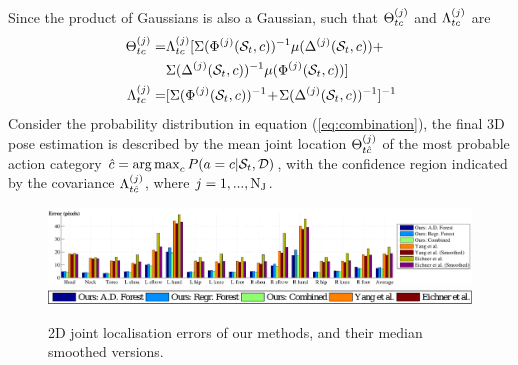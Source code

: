 Since the product of Gaussians is also a Gaussian, such that $\Theta^{(j)}_{t c}$ and $\Lambda^{(j)}_{t c}$ are 
\begin{equation}
	\label{eq:combination2}
	\begin{split}
		\Theta^{(j)}_{t c} = & \Lambda^{(j)}_{t c} 
		[
			\Sigma(\Phi^{(j)}(\mathcal{S}_{t}, c))^{-1} 
			\mu(\Delta^{(j)}(\mathcal{S}_{t}, c)) + \\ &  
			\Sigma(\Delta^{(j)}(\mathcal{S}_{t}, c))^{-1} 
			\mu(\Phi^{(j)}(\mathcal{S}_{t}, c))
		] \\  
		\Lambda^{(j)}_{t c} = &  
		[
			\Sigma(\Phi^{(j)}(\mathcal{S}_{t}, c))^{-1}\!
			+\!
			\Sigma(\Delta^{(j)}(\mathcal{S}_{t}, c))^{-1} 
		]^{-1}\!
		\end{split}
	\end{equation}
	Consider the probability distribution in equation (\ref{eq:combination}), the final 3D pose estimation is described by the mean joint location $\Theta^{(j)}_{t\hat{c}}$ of the most probable action category $\hat{c} = \operatorname*{arg\,max}_c  P(a = c | \mathcal{S}_{t}, \mathcal{D})$, with the confidence region indicated by the covariance $\Lambda^{(j)}_{t\hat{c}}$, where $ j=1,...,\mathrm{N_{J}}$. 

\label{sec:eval}

\begin{figure}[ht]
	\centering
	\includegraphics[width=1.02\linewidth]{fig/body/errplot2d.pdf} 
 	\includegraphics[width=0.6\linewidth]{fig/body/plot_legend.pdf}
	\caption{2D joint localisation errors of our methods, \cite{Yang2011} and \cite{Eichner2012} their median smoothed versions.}
\label{fig/body/errorplot2d}
\end{figure} 

